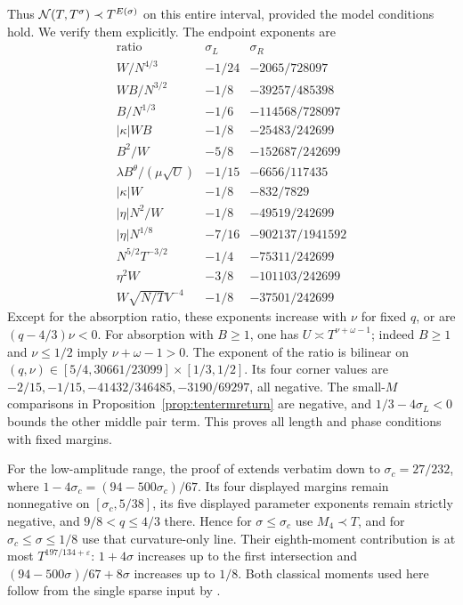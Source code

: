 Thus $\mathcal{N}(T,T^\sigma)\prec T^{E(\sigma)}$ on this entire interval,
provided the model conditions hold. We verify them explicitly.
The endpoint exponents are
\[
\begin{array}{c|cc}
 \text{ratio}&\sigma_L&\sigma_R\\\hline
 W/N^{4/3}&-1/24&-2065/728097\\
 WB/N^{3/2}&-1/8&-39257/485398\\
 B/N^{1/3}&-1/6&-114568/728097\\
 |\kappa|WB&-1/8&-25483/242699\\
 B^2/W&-5/8&-152687/242699\\
 \lambda B^\theta/(\mu\sqrt U)&-1/15&-6656/117435\\
 |\kappa|W&-1/8&-832/7829\\
 |\eta|N^2/W&-1/8&-49519/242699\\
 |\eta|N^{1/8}&-7/16&-902137/1941592\\
 N^{5/2}T^{-3/2}&-1/4&-75311/242699\\
 \eta^2W&-3/8&-101103/242699\\
 W\sqrt{N/T}V^{-4}&-1/8&-37501/242699
\end{array}
\]
Except for the absorption ratio, these exponents increase with $\nu$
for fixed $q$, or are $(q-4/3)\nu<0$.
For absorption with $B\ge1$, one has $U\asymp T^{\nu+\omega-1}$;
indeed $B\ge1$ and $\nu\le1/2$ imply $\nu+\omega-1>0$.
The exponent of the ratio is bilinear on
$(q,\nu)\in[5/4,30661/23099]\times[1/3,1/2]$.
Its four corner values are
$-2/15,-1/15,-41432/346485,-3190/69297$, all negative.
The small-$M$ comparisons in Proposition~\ref{prop:tentermreturn}
are negative, and $1/3-4\sigma_L<0$ bounds the other middle pair term.
This proves all length and phase conditions with fixed margins.

For the low-amplitude range, the proof of
\cite[Proposition~\ref*{six-prop:curvatureline}]{Weighted} extends verbatim down to
$\sigma_c=27/232$, where
$1-4\sigma_c=(94-500\sigma_c)/67$.
Its four displayed margins remain nonnegative on
$[\sigma_c,5/38]$, its five displayed parameter exponents remain strictly
negative, and $9/8<q\le4/3$ there. Hence for
$\sigma\le\sigma_c$ use $M_4\prec T$, and for
$\sigma_c\le\sigma\le1/8$ use that curvature-only line.
Their eighth-moment contribution is at most $T^{197/134+\varepsilon}$:
$1+4\sigma$ increases up to the first intersection and
$(94-500\sigma)/67+8\sigma$ increases up to $1/8$.
Both classical moments used here follow from the single sparse input
by \cite[Proposition~\ref*{six-prop:momentbaseproof}]{Weighted}.

